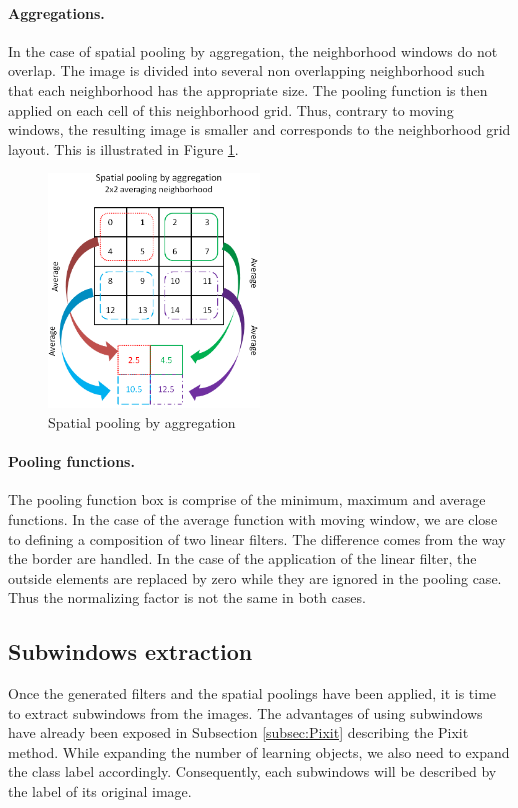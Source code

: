 \documentclass[a4paper]{report}
\begin{document}
			\paragraph{Aggregations.}
			In the case of spatial pooling by aggregation, the neighborhood windows do not overlap. The image is divided into several non overlapping neighborhood such that each neighborhood has the appropriate size. The pooling function is then applied on each cell of this neighborhood grid. Thus, contrary to moving windows, the resulting image is smaller and corresponds to the neighborhood grid layout. This is illustrated in Figure \ref{fig:PoolAgg}.
	\begin{figure}
		\centering
			\includegraphics[width=0.5\textwidth]{images/PoolAgg.png}
		\caption{\label{fig:PoolAgg}Spatial pooling by aggregation}
	\end{figure}
	
			\paragraph{Pooling functions.}
			The pooling function box is comprise of the minimum, maximum and average functions. In the case of the average function with moving window, we are close to defining a composition of two linear filters. The difference comes from the way the border are handled. In the case of the application of the linear filter, the outside elements are replaced by zero while they are ignored in the pooling case. Thus the normalizing factor is not the same in both cases.
			
		\subsection{Subwindows extraction}
		Once the generated filters and the spatial poolings have been applied, it is time to extract subwindows from the images. The advantages of using subwindows have already been exposed in Subsection \ref{subsec:Pixit} describing the Pixit method.
		While expanding the number of learning objects, we also need to expand the class label accordingly. Consequently, each subwindows will be described by the label of its original image.
		
\end{document}
